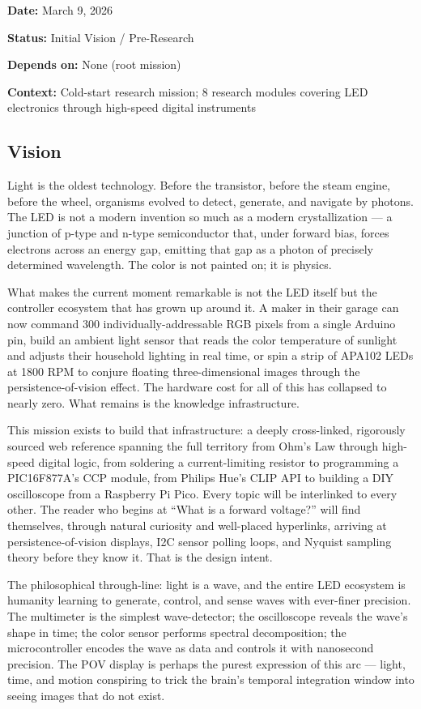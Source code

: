 \documentclass[11pt,letterpaper]{article}
\newcommand{\metafield}[2]{\textbf{\sffamily #1} #2\par}
\begin{document}
\metafield{Date:}{March 9, 2026}
\metafield{Status:}{Initial Vision / Pre-Research}
\metafield{Depends on:}{None (root mission)}
\metafield{Context:}{Cold-start research mission; 8 research modules covering LED electronics through high-speed digital instruments}

\subsection{Vision}

Light is the oldest technology. Before the transistor, before the steam engine, before the wheel, organisms evolved to detect, generate, and navigate by photons. The LED is not a modern invention so much as a modern crystallization --- a junction of p-type and n-type semiconductor that, under forward bias, forces electrons across an energy gap, emitting that gap as a photon of precisely determined wavelength. The color is not painted on; it is physics.

What makes the current moment remarkable is not the LED itself but the controller ecosystem that has grown up around it. A maker in their garage can now command 300 individually-addressable RGB pixels from a single Arduino pin, build an ambient light sensor that reads the color temperature of sunlight and adjusts their household lighting in real time, or spin a strip of APA102 LEDs at 1800 RPM to conjure floating three-dimensional images through the persistence-of-vision effect. The hardware cost for all of this has collapsed to nearly zero. What remains is the knowledge infrastructure.

This mission exists to build that infrastructure: a deeply cross-linked, rigorously sourced web reference spanning the full territory from Ohm's Law through high-speed digital logic, from soldering a current-limiting resistor to programming a PIC16F877A's CCP module, from Philips Hue's CLIP API to building a DIY oscilloscope from a Raspberry Pi Pico. Every topic will be interlinked to every other. The reader who begins at ``What is a forward voltage?'' will find themselves, through natural curiosity and well-placed hyperlinks, arriving at persistence-of-vision displays, I2C sensor polling loops, and Nyquist sampling theory before they know it. That is the design intent.

The philosophical through-line: light is a wave, and the entire LED ecosystem is humanity learning to generate, control, and sense waves with ever-finer precision. The multimeter is the simplest wave-detector; the oscilloscope reveals the wave's shape in time; the color sensor performs spectral decomposition; the microcontroller encodes the wave as data and controls it with nanosecond precision. The POV display is perhaps the purest expression of this arc --- light, time, and motion conspiring to trick the brain's temporal integration window into seeing images that do not exist.
\end{document}
